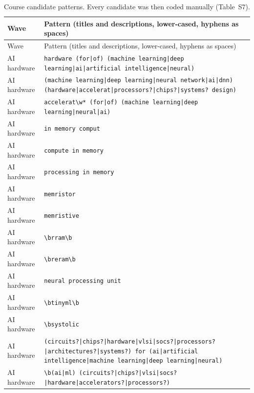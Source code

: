 \documentclass[10pt]{article}
\begin{document}
\begin{longtable}{@{}lL{13cm}@{}}
\caption{Course candidate patterns. Every candidate was then coded manually (Table~S7).}\label{tab:S6}\\
\toprule
Wave & Pattern (titles and descriptions, lower-cased, hyphens as spaces) \\
\midrule
\endfirsthead
\toprule
Wave & Pattern (titles and descriptions, lower-cased, hyphens as spaces) \\
\midrule
\endhead
\bottomrule
\endlastfoot
AI hardware & \texttt{hardware \allowbreak(for\allowbreak|of) \allowbreak(machine learning\allowbreak|deep learning\allowbreak|ai\allowbreak|artificial intelligence\allowbreak|neural)} \\
AI hardware & \texttt{\allowbreak(machine learning\allowbreak|deep learning\allowbreak|neural network\allowbreak|ai\allowbreak|dnn) \allowbreak(hardware\allowbreak|accelerat\allowbreak|processors?\allowbreak|chips?\allowbreak|systems? design)} \\
AI hardware & \texttt{accelerat\textbackslash{}w* \allowbreak(for\allowbreak|of) \allowbreak(machine learning\allowbreak|deep learning\allowbreak|neural\allowbreak|ai)} \\
AI hardware & \texttt{in memory comput} \\
AI hardware & \texttt{compute in memory} \\
AI hardware & \texttt{processing in memory} \\
AI hardware & \texttt{memristor} \\
AI hardware & \texttt{memristive} \\
AI hardware & \texttt{\textbackslash{}brram\textbackslash{}b} \\
AI hardware & \texttt{\textbackslash{}breram\textbackslash{}b} \\
AI hardware & \texttt{neural processing unit} \\
AI hardware & \texttt{\textbackslash{}btinyml\textbackslash{}b} \\
AI hardware & \texttt{\textbackslash{}bsystolic} \\
AI hardware & \texttt{\allowbreak(circuits?\allowbreak|chips?\allowbreak|hardware\allowbreak|vlsi\allowbreak|socs?\allowbreak|processors?\allowbreak|architectures?\allowbreak|systems?) for \allowbreak(ai\allowbreak|artificial intelligence\allowbreak|machine learning\allowbreak|deep learning\allowbreak|neural)} \\
AI hardware & \texttt{\textbackslash{}b\allowbreak(ai\allowbreak|ml) \allowbreak(circuits?\allowbreak|chips?\allowbreak|vlsi\allowbreak|socs?\allowbreak|hardware\allowbreak|accelerators?\allowbreak|processors?)} \\

\end{longtable}
\end{document}
